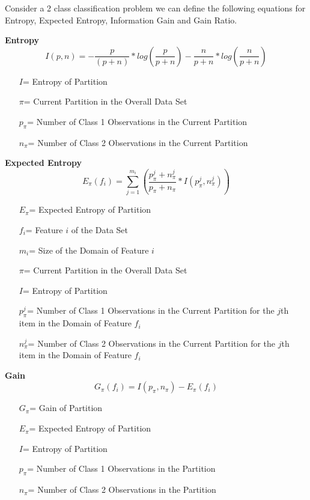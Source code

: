 \documentclass[twoside,11pt]{article}
\begin{document}
Consider a 2 class classification problem we can define the following equations for Entropy, Expected Entropy, Information Gain and Gain Ratio.\newline

\textbf{Entropy}
\begin{equation}
I(p,n) = -\frac{p}{(p+n)} * log(\frac{p}{p+n}) - \frac{n}{p+n} * log(\frac{n}{p+n})
\end{equation}
\begin{itemize}
	\item[$I$=] Entropy of Partition
	\item[$\pi$=] Current Partition in the Overall Data Set
	\item[$p_\pi$=] Number of Class 1 Observations in the Current Partition
	\item[$n_\pi$=] Number of Class 2 Observations in the Current Partition
\end{itemize}

\textbf{Expected Entropy}
\begin{equation}
	E_\pi(f_i) = \sum_{j=1}^{m_i}(\frac{p_\pi^j + n_\pi^j}{p_\pi + n_\pi} * I(p_\pi^j, n_\pi^j))
\end{equation}
\begin{itemize}
	\item[$E_\pi$=] Expected Entropy of Partition
	\item[$f_i$=] Feature $i$ of the Data Set
	\item[$m_i$=] Size of the Domain of Feature $i$
	\item[$\pi$=] Current Partition in the Overall Data Set
	\item[$I$=] Entropy of Partition
	\item[$p_\pi^j$=] Number of Class 1 Observations in the Current Partition for the $j$th item in the Domain of Feature $f_i$
	\item[$n_\pi^j$=] Number of Class 2 Observations in the Current Partition for the $j$th item in the Domain of Feature $f_i$
\end{itemize}

\textbf{Gain}
\begin{equation}
	G_\pi(f_i)  = I(p_\pi, n_\pi) - E_\pi(f_i)
\end{equation}
\begin{itemize}
	\item[$G_\pi$=] Gain of Partition
	\item[$E_\pi$=] Expected Entropy of Partition
	\item[$I$=] Entropy of Partition
	\item[$p_\pi$=] Number of Class 1 Observations in the Partition
	\item[$n_\pi$=] Number of Class 2 Observations in the Partition
\end{itemize}
\end{document}
